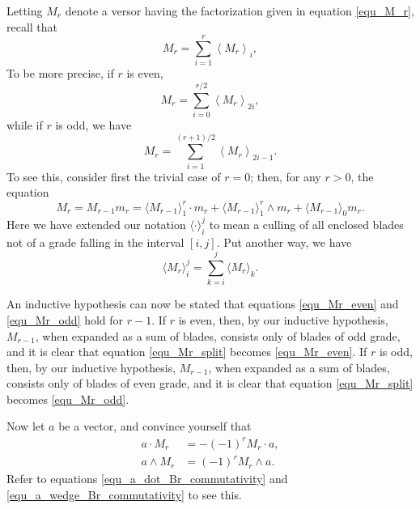 \documentclass{birkjour}
\theoremstyle{definition}
\theoremstyle{remark}
\numberwithin{equation}{section}
\begin{document}
Letting $M_r$ denote a versor having the factorization given in equation \eqref{equ_M_r}, recall that
\begin{equation*}
M_r = \sum_{i=1}^r\left\langle M_r\right\rangle_i,
\end{equation*}
To be more precise, if $r$ is even,
\begin{equation}\label{equ_Mr_even}
M_r = \sum_{i=0}^{r/2}\left\langle M_r\right\rangle_{2i},
\end{equation}
while if $r$ is odd, we have
\begin{equation}\label{equ_Mr_odd}
M_r = \sum_{i=1}^{(r+1)/2}\left\langle M_r\right\rangle_{2i-1}.
\end{equation}
To see this, consider first the trivial case of $r=0$; then, for any $r>0$, the equation
\begin{equation}\label{equ_Mr_split}
M_r = M_{r-1}m_r = \langle M_{r-1}\rangle_1^r\cdot m_r + \langle M_{r-1}\rangle_1^r\wedge m_r + \langle M_{r-1}\rangle_0 m_r.
\end{equation}
Here we have extended our notation $\langle\cdot\rangle_i^j$ to mean a culling of all enclosed blades not of a grade falling
in the interval $[i,j]$.  Put another way, we have
\begin{equation*}
\langle M_r\rangle_i^j = \sum_{k=i}^j\langle M_r\rangle_k.
\end{equation*}

An inductive hypothesis can now be stated that equations \eqref{equ_Mr_even} and \eqref{equ_Mr_odd} hold for $r-1$.
If $r$ is even, then, by our inductive hypothesis, $M_{r-1}$, when expanded as a sum of blades, consists only of blades of odd grade,
and it is clear that equation \eqref{equ_Mr_split} becomes \eqref{equ_Mr_even}.  If $r$ is odd, then, by our inductive hypothesis, $M_{r-1}$, when expanded as
a sum of blades, consists only of blades of even grade, and it is clear that equation \eqref{equ_Mr_split} becomes \eqref{equ_Mr_odd}.

Now let $a$ be a vector, and convince yourself that
\begin{align}
a\cdot M_r &= -(-1)^r M_r\cdot a,\label{equ_a_dot_Mr_commutativity} \\
a\wedge M_r &= (-1)^r M_r\wedge a.\label{equ_a_wedge_Mr_commutativity}
\end{align}
Refer to equations \eqref{equ_a_dot_Br_commutativity} and \eqref{equ_a_wedge_Br_commutativity} to see this.
\end{document}
